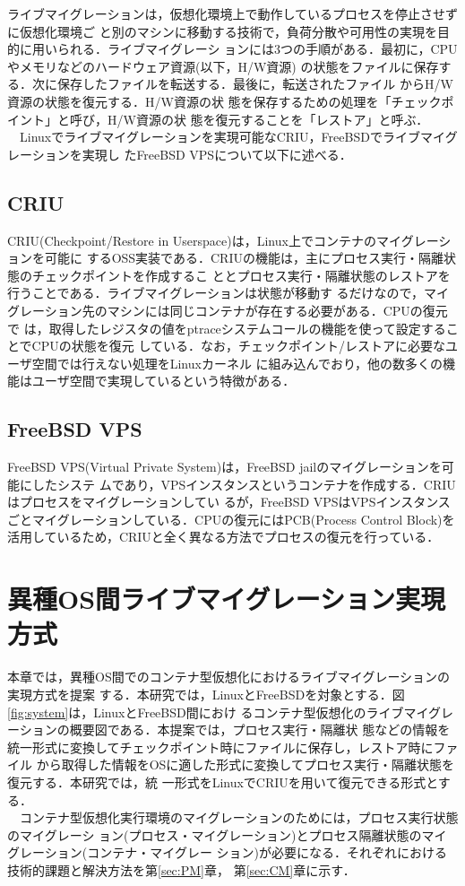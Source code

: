\documentclass[11pt]{jarticle}
\begin{document}
ライブマイグレーションは，仮想化環境上で動作しているプロセスを停止させずに仮想化環境ご
と別のマシンに移動する技術で，負荷分散や可用性の実現を目的に用いられる．ライブマイグレーシ
ョンには3つの手順がある．最初に，CPUやメモリなどのハードウェア資源(以下，H/W資源)
の状態をファイルに保存する．次に保存したファイルを転送する．最後に，転送されたファイル
からH/W資源の状態を復元する．H/W資源の状
態を保存するための処理を「チェックポイント」と呼び，H/W資源の状
態を復元することを「レストア」と呼ぶ．\\
　Linuxでライブマイグレーションを実現可能なCRIU，FreeBSDでライブマイグレーションを実現し
たFreeBSD VPSについて以下に述べる．

\subsection{CRIU}
\label{sec:CRIU}
CRIU(Checkpoint/Restore in Userspace)は，Linux上でコンテナのマイグレーションを可能に
するOSS実装である．CRIUの機能は，主にプロセス実行・隔離状態のチェックポイントを作成するこ
ととプロセス実行・隔離状態のレストアを行うことである．ライブマイグレーションは状態が移動す
るだけなので，マイグレーション先のマシンには同じコンテナが存在する必要がある．CPUの復元で
は，取得したレジスタの値をptraceシステムコールの機能を使って設定することでCPUの状態を復元
している．なお，チェックポイント/レストアに必要なユーザ空間では行えない処理をLinuxカーネル
に組み込んでおり，他の数多くの機能はユーザ空間で実現しているという特徴がある．

\subsection{FreeBSD VPS}
\label{sec:FreeBSD VPS}
FreeBSD VPS(Virtual Private System)は，FreeBSD jailのマイグレーションを可能にしたシステ
ムであり，VPSインスタンスというコンテナを作成する．CRIUはプロセスをマイグレーションしてい
るが，FreeBSD VPSはVPSインスタンスごとマイグレーションしている．CPUの復元にはPCB(Process
Control Block)を活用しているため，CRIUと全く異なる方法でプロセスの復元を行っている．

\section{異種OS間ライブマイグレーション実現方式}
\label{sec:suggest}
本章では，異種OS間でのコンテナ型仮想化におけるライブマイグレーションの実現方式を提案
する．本研究では，LinuxとFreeBSDを対象とする．図\ref{fig:system}は，LinuxとFreeBSD間におけ
るコンテナ型仮想化のライブマイグレーションの概要図である．本提案では，プロセス実行・隔離状
態などの情報を統一形式に変換してチェックポイント時にファイルに保存し，レストア時にファイル
から取得した情報をOSに適した形式に変換してプロセス実行・隔離状態を復元する．本研究では，統
一形式をLinuxでCRIUを用いて復元できる形式とする．\\
　コンテナ型仮想化実行環境のマイグレーションのためには，プロセス実行状態のマイグレーシ
ョン(プロセス・マイグレーション)とプロセス隔離状態のマイグレーション(コンテナ・マイグレー
ション)が必要になる．それぞれにおける技術的課題と解決方法を第\ref{sec:PM}章，
第\ref{sec:CM}章に示す．
\end{document}
